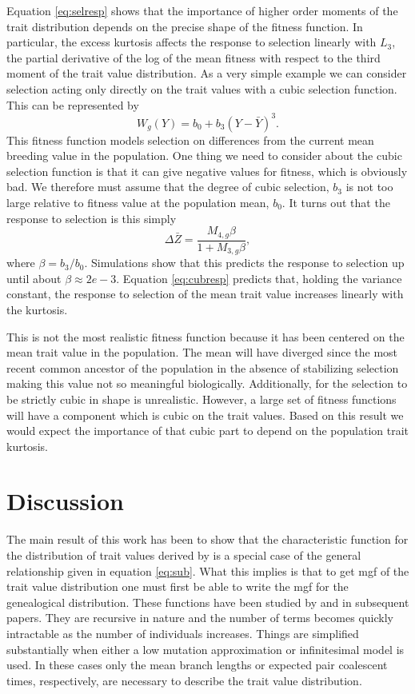 \documentclass{article}
\begin{document}
Equation \eqref{eq:selresp} shows that the importance of higher order moments of
the trait distribution depends on the precise shape of the fitness function. In
particular, the excess kurtosis affects the response to selection linearly with
$L_3$, the partial derivative of the log of the mean fitness with respect to the
third moment of the trait value distribution. As a very simple example we can
consider selection acting only directly on the trait values with a cubic
selection function. This can be represented by
\begin{equation}
  \label{eq:cubsel}
  W_g(Y) = b_0 + b_3(Y-\bar{Y})^3.
\end{equation}
This fitness function models selection on differences from the current mean
breeding value in the population. One thing we need to consider about the cubic
selection function is that it can give negative values for fitness, which is
obviously bad. We therefore must assume that the degree of cubic selection,
$b_3$ is not too large relative to fitness value at the population mean, $b_0$.
It turns out that the response to selection is this simply
\begin{equation}
  \label{eq:cubresp}
  \Delta \bar{Z} = \frac{M_{4,g}\beta}{1 + M_{3,g}\beta},
\end{equation}
where $\beta=b_3/b_0$. Simulations show that this predicts the response to
selection up until about $\beta\approx 2e-3$. Equation \eqref{eq:cubresp}
predicts that, holding the variance constant, the response to selection of the
mean trait value increases linearly with the kurtosis.

This is not the most realistic fitness function because it has been centered on
the mean trait value in the population. The mean will have diverged since the
most recent common ancestor of the population in the absence of stabilizing
selection making this value not so meaningful biologically. Additionally, for
the selection to be strictly cubic in shape is unrealistic. However, a large set
of fitness functions will have a component which is cubic on the trait values.
Based on this result we would expect the importance of that cubic part to depend
on the population trait kurtosis.
\section{Discussion}
The main result of this work has been to show that the characteristic function
for the distribution of trait values derived by \citet{Schraiber2015} is a
special case of the general relationship given in equation \eqref{eq:sub}. What
this implies is that to get mgf of the trait value distribution one must first
be able to write the mgf for the genealogical distribution. These functions have
been studied by \citet{Lohse2011} and in subsequent papers. They are recursive
in nature and the number of terms becomes quickly intractable as the number of
individuals increases. Things are simplified substantially when either a low
mutation approximation or infinitesimal model is used. In these cases only the
mean branch lengths or expected pair coalescent times, respectively, are
necessary to describe the trait value distribution.
\end{document}
